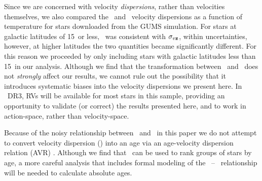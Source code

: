 Since we are concerned with velocity {\it dispersions}, rather than velocities
themselves, we also compared the \vb\ and \vz\ velocity dispersions as a
function of temperature for
stars downloaded from the GUMS simulation.
For stars at galactic latitudes of 15\degrees\ or less, \sigmavb\ was
consistent with $\sigma_{v{\bf z}}$, within uncertainties, however, at higher
latitudes the two quantities became significantly different.
For this reason we proceeded by only including stars with galactic latitudes
less than 15\degrees\ in our analysis.
Although we find that the transformation between \vz\ and \vb\ does not {\it
strongly} affect our results, we cannot rule out the possibility that it
introduces systematic biases into the velocity dispersions we present here.
In \gaia\ DR3, RVs will be available for most stars in this sample, providing
an opportunity to validate (or correct) the results presented here, and to
work in action-space, rather than velocity-space.



Because of the noisy relationship between \vb\ and \vz\, in this paper we do
not attempt to convert velocity dispersion (\sigmavb) into an age via an
age-velocity dispersion relation (AVR) \citep[\eg][]{holmberg2009}.
Although we find that \sigmavb\ can be used to rank groups of stars by age, a
more careful analysis that includes formal modeling of the \vb\ -- \vz\
relationship will be needed to calculate absolute ages.

